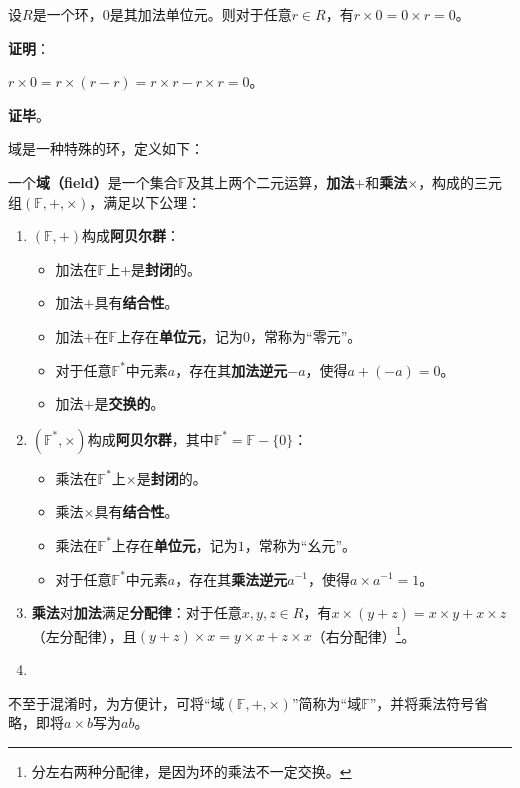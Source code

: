 \begin{theorem}{}
设$R$是一个环，$0$是其加法单位元。则对于任意$r\in R$，有$r\times 0=0\times r=0$。
\end{theorem}
\textbf{证明}：

$r\times 0=r\times (r-r)=r\times r-r\times r=0$。

\textbf{证毕}。

域是一种特殊的环，定义如下：

\begin{definition}{}\label{def_field_4}
一个\textbf{域（field）}是一个集合$\mathbb{F}$及其上两个二元运算，\textbf{加法}$+$和\textbf{乘法}$\times$，构成的三元组$(\mathbb{F}, +, \times)$，满足以下公理：

\begin{enumerate}
    \item $(\mathbb{F}, +)$构成\textbf{阿贝尔群}：
    \begin{itemize}
    \item 加法在$\mathbb{F}$上$+$是\textbf{封闭}的。
    \item 加法$+$具有\textbf{结合性}。
    \item 加法$+$在$\mathbb{F}$上存在\textbf{单位元}，记为$0$，常称为“零元”。
    \item 对于任意$\mathbb{F}^*$中元素$a$，存在其\textbf{加法逆元}$-a$，使得$a+(-a)=0$。
    \item 加法$+$是\textbf{交换的}。
    \end{itemize}
    \item $(\mathbb{F}^*, \times)$构成\textbf{阿贝尔群}，其中$\mathbb{F}^*=\mathbb{F}-\{0\}$：
    \begin{itemize}
    \item 乘法在$\mathbb{F}^*$上$\times$是\textbf{封闭}的。
    \item 乘法$\times$具有\textbf{结合性}。
    \item 乘法在$\mathbb{F}^*$上存在\textbf{单位元}，记为$1$，常称为“幺元”。
    \item 对于任意$\mathbb{F}^*$中元素$a$，存在其\textbf{乘法逆元}$a^{-1}$，使得$a\times a^{-1}=1$。
    \end{itemize}
    \item \textbf{乘法}对\textbf{加法}满足\textbf{分配律}：对于任意$x, y, z\in R$，有$x\times(y+z)=x\times y+x\times z$（左分配律），且$(y+z)\times x=y\times x+z\times x$（右分配律）\footnote{分左右两种分配律，是因为环的乘法不一定交换。}。
    \item 
\end{enumerate}

不至于混淆时，为方便计，可将“域$(\mathbb{F}, +, \times)$”简称为“域$\mathbb{F}$”，并将乘法符号省略，即将$a\times b$写为$ab$。
\end{definition}


